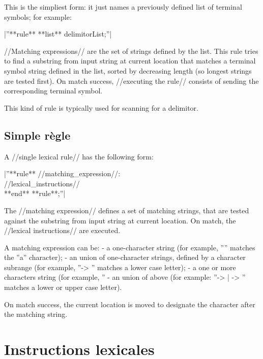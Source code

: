 This is the simpliest form: it just names a previously defined list of terminal symbols; for example:

|''**rule** **list** delimitorList;''|

//Matching expressions// are the set of strings defined by the list. This rule tries to find a substring from input string at current location that matches a terminal symbol string defined in the list, sorted by decreasing length (so longest strings are tested first). On match success, //executing the rule// consists of sending the corresponding terminal symbol.

This kind of rule is typically used for scanning for a delimitor.

\subsection{Simple règle}

A //single lexical rule// has the following form:

|''**rule** //matching\_expression//:\\  //lexical\_instructions//\\ **end** **rule**;''|

The //matching expression// defines a set of matching strings, that are tested against the substring from input string at current location. On match, the //lexical instructions// are executed.

A matching expression can be:
  - a one-character string (for example, ''\textquotesingle'' matches the ''a'' character);
  - an union of one-character strings, defined by a character subrange (for example, ''\textquotesingle -> \textquotesingle'' matches a lower case letter);
  - a one or more characters string (for example, ''%
  - an union of above (for example: ''\textquotesingle -> \textquotesingle | \textquotesingle -> \textquotesingle'' matches a lower or upper case letter).

On match success, the current location is moved to designate the character after the matching string.

\section{Instructions lexicales}



